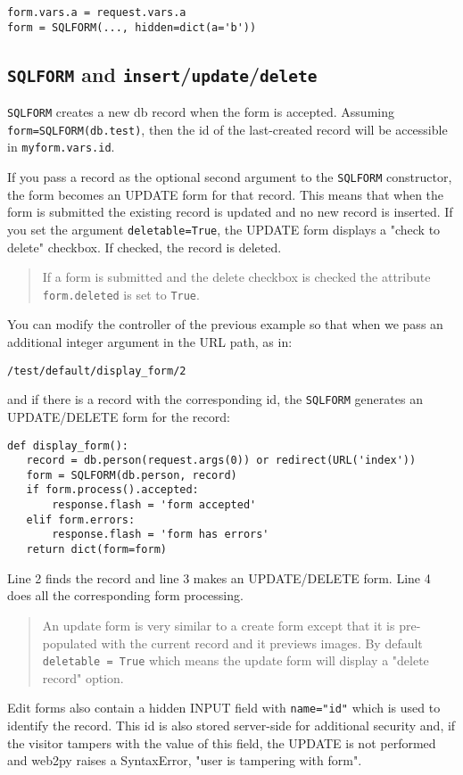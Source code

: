\documentclass[justified,sixbynine,notoc]{tufte-book}
\def\ft{\small\tt}
\def\inxx#1{\index{#1}}
\begin{document}
\begin{fullwidth}
\begin{lstlisting}
form.vars.a = request.vars.a
form = SQLFORM(..., hidden=dict(a='b'))
\end{lstlisting}

\goodbreak\subsection{{\ft SQLFORM} and {\ft insert}/{\ft update}/{\ft delete}}

{\ft SQLFORM} creates a new db record when the form is accepted. Assuming {\ft form=SQLFORM(db.test)}, then the id of the last-created record will be accessible in {\ft myform.vars.id}.

\inxx{delete record}
If you pass a record as the optional second argument to the {\ft SQLFORM} constructor, the form becomes an UPDATE form for that record. This means that when the form is submitted the existing record is updated and no new record is inserted. If you set the argument {\ft deletable=True}, the UPDATE form displays a "check to delete" checkbox. If checked, the record is deleted.

\begin{quote}If a form is submitted and the delete checkbox is checked the attribute
{\ft form.deleted} is set to {\ft True}.\end{quote}
You can modify the controller of the previous example so that when we pass an additional integer argument in the URL path, as in:
\begin{lstlisting}
/test/default/display_form/2
\end{lstlisting}
\noindent and if there is a record with the corresponding id, the {\ft SQLFORM} generates an UPDATE/DELETE form for the record:
\begin{lstlisting}
def display_form():
   record = db.person(request.args(0)) or redirect(URL('index'))
   form = SQLFORM(db.person, record)
   if form.process().accepted:
       response.flash = 'form accepted'
   elif form.errors:
       response.flash = 'form has errors'
   return dict(form=form)
\end{lstlisting}

Line 2 finds the record and line 3 makes an UPDATE/DELETE form. Line 4 does all the corresponding form processing.

\begin{quote}An update form is very similar to a create form except that it is pre-populated with the current record and it previews images. By default {\ft deletable = True} which means the update form will display a "delete record" option.\end{quote}
Edit forms also contain a hidden INPUT field with {\ft name="id"} which is used to identify the record. This id is also stored server-side for additional security and, if the visitor tampers with the value of this field, the UPDATE is not performed and web2py raises a SyntaxError, "user is tampering with form".


\end{fullwidth}
\end{document}
